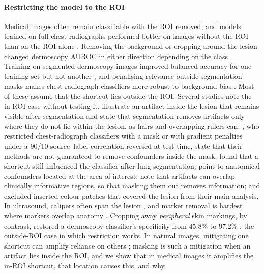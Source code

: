 \documentclass[review,3p]{elsarticle}
\begin{document}
\paragraph{Restricting the model to the ROI} Medical images often remain classifiable with the ROI removed, and models
trained on full chest radiographs performed better on images without the ROI than on the ROI alone
\citep{sourget2025mask}. Removing the background or cropping around the lesion changed dermoscopy AUROC in either
direction depending on the class \citep{mahbod2020segmentation}. Training on segmented dermoscopy images improved
balanced accuracy for one training set but not another \citep{maron2021confounding}, and penalising relevance outside segmentation masks makes chest-radiograph
classifiers more robust to background bias \citep{bassi2024isnet}. Most of these assume that the shortcut lies outside
the ROI. Several studies note the in-ROI case without testing it. \citet{maron2021confounding} illustrate an artifact inside the lesion that remains visible after segmentation and state that segmentation removes artifacts only where they do not lie within the lesion, as hairs and overlapping rulers can; \citet{viviano2021saliency}, who restricted chest-radiograph classifiers with a mask or with gradient penalties under a 90/10 source--label correlation reversed at test time, state that their methods are not guaranteed to remove confounders inside the mask; \citet{benahmed2022multisite} found that a shortcut still influenced the classifier after lung segmentation; \citet{sourget2025mask} point to anatomical confounders located at the area of interest; \citet{pahde2023r2r,pahde2025ensuring} note that artifacts can overlap clinically informative regions, so that masking them out removes information; and \citet{nauta2022uncovering} excluded inserted colour patches that covered the lesion from their main analysis. In ultrasound, calipers often span the lesion \citep{bunnell2024busclean}, and marker removal is hardest where markers overlap anatomy \citep{wang2026echodm}. Cropping away \emph{peripheral} skin markings, by contrast, restored a dermoscopy classifier's specificity from 45.8\% to 97.2\% \citep{winkler2019markings}: the outside-ROI case in which restriction works. In natural images, mitigating one shortcut can amplify reliance on others \citep{li2023whacamole}; masking is
such a mitigation when an artifact lies inside the ROI, and we show that in medical images it amplifies the in-ROI
shortcut, that location causes this, and why.
\end{document}

